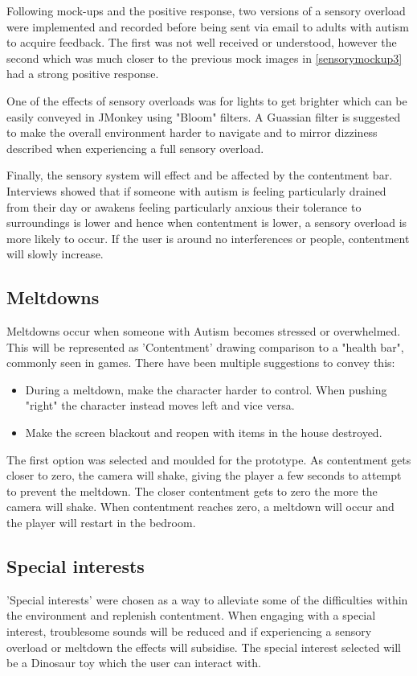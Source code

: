 Following mock-ups and the positive response, two versions of a sensory overload were implemented and recorded before being sent via email to adults with autism to acquire feedback. The first was not well received or understood, however the second which was much closer to the previous mock images in \ref{sensorymockup3} had a strong positive response.  

One of the effects of sensory overloads was for lights to get brighter which can be easily conveyed in JMonkey using "Bloom" filters. A Guassian filter is suggested to make the overall environment harder to navigate and to mirror dizziness described when experiencing a full sensory overload. 

Finally, the sensory system will effect and be affected by the contentment bar. Interviews showed that if someone with autism is feeling particularly drained from their day or awakens feeling particularly anxious their tolerance to surroundings is lower and hence when contentment is lower, a sensory overload is more likely to occur. If the user is around no interferences or people, contentment will slowly increase. 

\subsection{Meltdowns}
Meltdowns occur when someone with Autism becomes stressed or overwhelmed. This will be represented as 'Contentment' drawing comparison to a "health bar", commonly seen in games. There have been multiple suggestions to convey this:

\begin{itemize}
\item During a meltdown, make the character harder to control. When pushing "right" the character instead moves left and vice versa.
\item Make the screen blackout and reopen with items in the house destroyed.
\end{itemize}

The first option was selected and moulded for the prototype. As contentment gets closer to zero, the camera will shake, giving the player a few seconds to attempt to prevent the meltdown. The closer contentment gets to zero the more the camera will shake. When contentment reaches zero, a meltdown will occur and the player will restart in the bedroom. 

\subsection{Special interests}
'Special interests' were chosen as a way to alleviate some of the difficulties within the environment and replenish contentment. When engaging with a special interest, troublesome sounds will be reduced and if experiencing a sensory overload or meltdown the effects will subsidise. The special interest selected will be a Dinosaur toy which the user can interact with.

